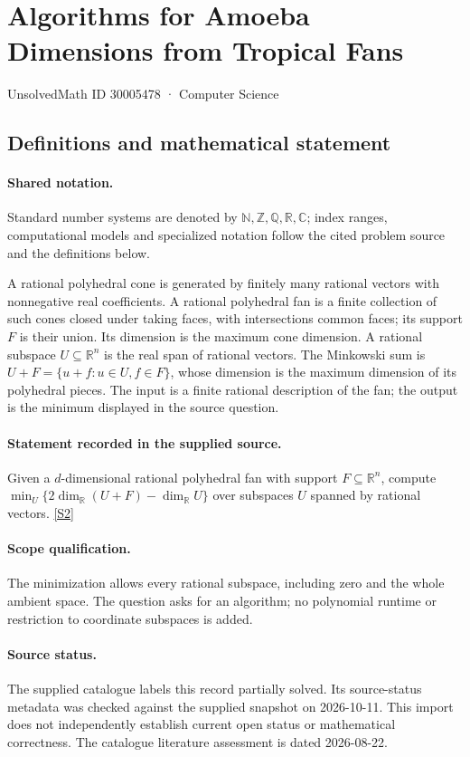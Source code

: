 \documentclass[11pt]{article}
\newcommand{\sref}[2]{\hyperlink{source:#1:#2}{[S#2]}}
\begin{document}
\setcounter{section}{30005477}
\section{Algorithms for Amoeba Dimensions from Tropical Fans}\label{30005478}
{\small\sffamily UnsolvedMath ID 30005478 · Computer Science}
\subsection{Definitions and mathematical statement}

\paragraph{Shared notation.}Standard number systems are denoted by $\mathbb N,\mathbb Z,\mathbb Q,\mathbb R,\mathbb C$; index ranges, computational models and specialized notation follow the cited problem source and the definitions below.


A rational polyhedral cone is generated by finitely many rational vectors with nonnegative real coefficients. A rational polyhedral fan is a finite collection of such cones closed under taking faces, with intersections common faces; its support $F$ is their union. Its dimension is the maximum cone dimension. A rational subspace $U\subseteq\mathbb R^n$ is the real span of rational vectors. The Minkowski sum is $U+F=\{u+f:u\in U,f\in F\}$, whose dimension is the maximum dimension of its polyhedral pieces. The input is a finite rational description of the fan; the output is the minimum displayed in the source question.
\paragraph{Statement recorded in the supplied source.}
Given a $d$-dimensional rational polyhedral fan with support $F\subseteq\mathbb R^n$, compute $\min_U\{2\dim_{\mathbb R}(U+F)-\dim_{\mathbb R}U\}$ over subspaces $U$ spanned by rational vectors. \sref{30005478}{2}
\paragraph{Scope qualification.}
The minimization allows every rational subspace, including zero and the whole ambient space. The question asks for an algorithm; no polynomial runtime or restriction to coordinate subspaces is added.
\paragraph{Source status.}
The supplied catalogue labels this record partially solved. Its source-status metadata was checked against the supplied snapshot on 2026-10-11. This import does not independently establish current open status or mathematical correctness. The catalogue literature assessment is dated 2026-08-22.
\end{document}
